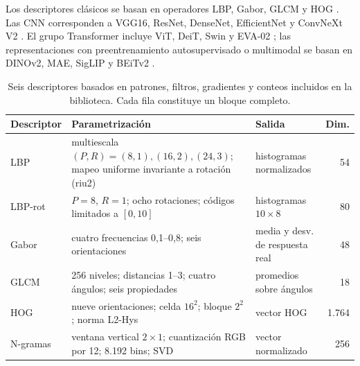 \documentclass[a4paper,fleqn]{cas-sc}
\begin{document}
Los descriptores clásicos se basan en operadores LBP,
Gabor, GLCM y HOG \citep{ojala2002lbp,mehta2016drlbp,jain1991gabor,haralick1979glcm,dalal2005hog}.
Las CNN corresponden a VGG16, ResNet, DenseNet, EfficientNet y ConvNeXt V2
\citep{simonyan2015vgg,he2016resnet,huang2017densenet,tan2019efficientnet,woo2023convnextv2}.
El grupo Transformer incluye ViT, DeiT, Swin y EVA-02
\citep{dosovitskiy2021vit,touvron2021deit,liu2021swin,fang2024eva02}; las
representaciones con preentrenamiento autosupervisado o multimodal se basan en
DINOv2, MAE, SigLIP y BEiTv2 \citep{oquab2024dinov2,he2022mae,zhai2023siglip,peng2022beitv2}.

\begin{table}[pos=htbp]
\centering
\caption{Seis descriptores basados en patrones, filtros, gradientes y conteos incluidos en la biblioteca. Cada fila constituye un bloque completo.}
\label{tab:extractores-clasicos}
\small
\begin{tabular}{@{}lp{7.0cm}p{3.2cm}r@{}}
\toprule
Descriptor & Parametrización & Salida & Dim. \\
\midrule
LBP & multiescala $(P,R)=(8,1),(16,2),(24,3)$; mapeo uniforme invariante a rotación (riu2) & histogramas normalizados & 54 \\
LBP-rot & $P=8$, $R=1$; ocho rotaciones; códigos limitados a $[0,10]$ & histogramas $10\times 8$ & 80 \\
Gabor & cuatro frecuencias 0,1--0,8; seis orientaciones & media y desv. de respuesta real & 48 \\
GLCM & 256 niveles; distancias 1--3; cuatro ángulos; seis propiedades & promedios sobre ángulos & 18 \\
HOG & nueve orientaciones; celda $16^2$; bloque $2^2$; norma L2-Hys & vector HOG & 1.764 \\
N-gramas & ventana vertical $2\times1$; cuantización RGB por 12; 8.192 bins; SVD & vector normalizado & 256 \\
\bottomrule
\end{tabular}
\end{table}
\end{document}

